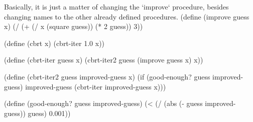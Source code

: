 Basically, it is just a matter of changing the `improve` procedure, besides changing names to the other already defined procedures.
\begtt\scm
(define (improve guess x)
  (/ (+ (/ x (square guess))
        (* 2 guess))
     3))

(define (cbrt x)
  (cbrt-iter 1.0 x))

(define (cbrt-iter guess x)
  (cbrt-iter2 guess (improve guess x) x))

(define (cbrt-iter2 guess improved-guess x)
  (if (good-enough? guess improved-guess)
      improved-guess
      (cbrt-iter improved-guess x)))

(define (good-enough? guess improved-guess)
  (< (/ (abs (- guess improved-guess)) guess) 0.001))
\endtt
